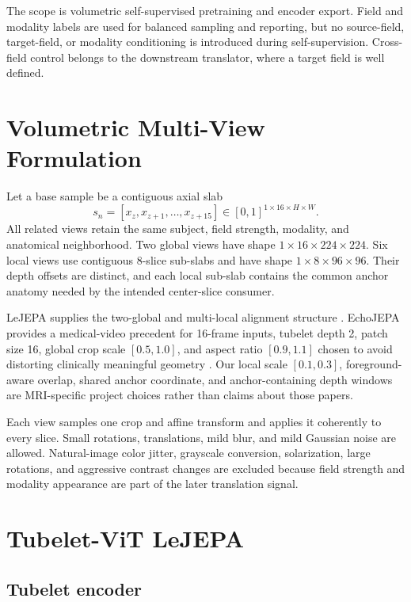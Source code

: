 \documentclass[10pt]{article}
\begin{document}
The scope is volumetric self-supervised pretraining and encoder export. Field
and modality labels are used for balanced sampling and reporting, but no
source-field, target-field, or modality conditioning is introduced during
self-supervision. Cross-field control belongs to the downstream translator,
where a target field is well defined.

\section{Volumetric Multi-View Formulation}

Let a base sample be a contiguous axial slab
\begin{equation}
  s_n=[x_z,x_{z+1},\ldots,x_{z+15}]
  \in [0,1]^{1\times16\times H\times W}.
\end{equation}
All related views retain the same subject, field strength, modality, and
anatomical neighborhood. Two global views have shape
$1\times16\times224\times224$. Six local views use contiguous 8-slice
sub-slabs and have shape $1\times8\times96\times96$. Their depth offsets are
distinct, and each local sub-slab contains the common anchor anatomy needed by
the intended center-slice consumer.

LeJEPA supplies the two-global and multi-local alignment structure
\cite{lejepa}. EchoJEPA provides a medical-video precedent for 16-frame inputs,
tubelet depth 2, patch size 16, global crop scale $[0.5,1.0]$, and aspect ratio
$[0.9,1.1]$ chosen to avoid distorting clinically meaningful geometry
\cite{echojepa}. Our local scale $[0.1,0.3]$, foreground-aware overlap, shared
anchor coordinate, and anchor-containing depth windows are MRI-specific
project choices rather than claims about those papers.

Each view samples one crop and affine transform and applies it coherently to
every slice. Small rotations, translations, mild blur, and mild Gaussian noise
are allowed. Natural-image color jitter, grayscale conversion, solarization,
large rotations, and aggressive contrast changes are excluded because field
strength and modality appearance are part of the later translation signal.

\newpage

\section{Tubelet-ViT LeJEPA}

\subsection{Tubelet encoder}
\end{document}
